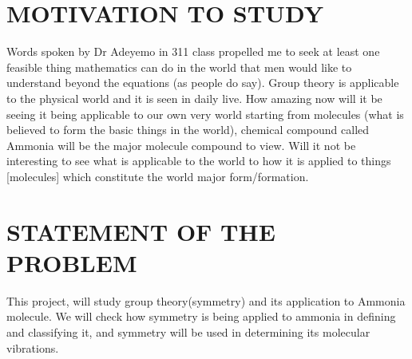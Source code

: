\documentclass[a4paper, 12pt, openany]{report}
\begin{document}
	\section{MOTIVATION TO STUDY}
		Words spoken by Dr Adeyemo in 311 class propelled me to seek at least one feasible thing mathematics can do in the world that men would like to understand beyond the equations (as people do say). Group theory is  applicable to the physical world and it is seen in daily live. How amazing now will it be seeing it being applicable to our own very world starting from molecules (what is believed to form the basic things in the world), chemical compound called Ammonia  will be the major molecule compound to view. Will it not be interesting to see what is applicable to the world to how it is applied to things [molecules] which constitute the world major form/formation.
	
	\section{STATEMENT OF THE PROBLEM}
	This project, will study group theory(symmetry) and its application to \break Ammonia molecule. We will check how symmetry is being applied to \break ammonia in defining and classifying it, and symmetry will be used in \break determining its  molecular vibrations.
\end{document}
